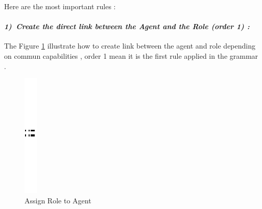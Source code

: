   
\pagebreak

Here are the most important rules :  

\paragraph{\emph{1)~Create the direct link  between the Agent and the Role (order 1) :} } The Figure \ref{fig:Create link between Agent and Role} illustrate how to create link between the agent and role depending on commun capabilities , order 1 mean it is the first rule applied in the grammar . 

\vspace{1cm}
\begin{figure}[th]
\centering
		\quad{}
		\includegraphics{Chapiter3/img/sep}
		\quad{}
\caption{\label{fig:Create link between Agent and Role}Assign Role to Agent } 
\end{figure}
 

